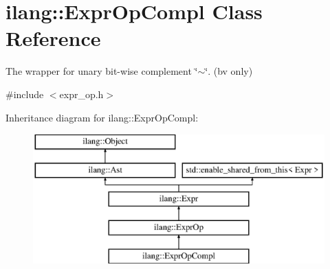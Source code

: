 \hypertarget{classilang_1_1_expr_op_compl}{}\section{ilang\+:\+:Expr\+Op\+Compl Class Reference}
\label{classilang_1_1_expr_op_compl}


The wrapper for unary bit-\/wise complement \char`\"{}$\sim$\char`\"{}. (bv only)  




{\ttfamily \#include $<$expr\+\_\+op.\+h$>$}

Inheritance diagram for ilang\+:\+:Expr\+Op\+Compl\+:\begin{figure}[H]
\begin{center}
\leavevmode
\includegraphics[height=5.000000cm]{classilang_1_1_expr_op_compl}
\end{center}
\end{figure}
